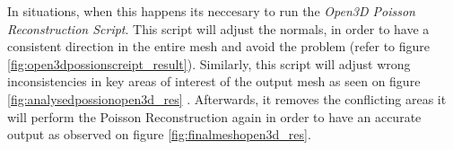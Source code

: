 \documentclass[12pt]{report}
\begin{document}
In situations, when this happens its neccesary to run the \textit{Open3D Poisson Reconstruction Script}.
This script will adjust the normals, in order to have a consistent direction in the entire mesh and avoid the problem (refer to figure \ref{fig:open3dpossionscreipt_result}).
Similarly, this script will adjust wrong inconsistencies in key areas of interest of the output mesh as seen on figure \ref{fig:analysedpossionopen3d_res} . 
Afterwards, it removes the conflicting areas it will perform the Poisson Reconstruction again in  order to have an accurate output as observed on figure \ref{fig:finalmeshopen3d_res}.

\begin{figure}[H]%
  \centering
 
  \qquad
  \qquad

\end{figure}
\end{document}
